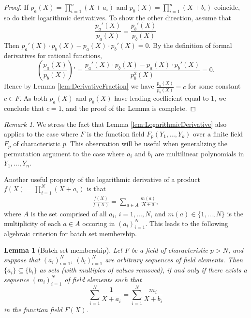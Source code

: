 \documentclass[11pt]{article}
\newtheorem{lem}[]{Lemma}
\theoremstyle{definition}
\theoremstyle{remark}
\newtheorem{rem}[thm]{Remark}
\begin{document}
\begin{proof}
If  $p_a(X) = \prod_{i=1}^n \left(X + a_i\right)$ and $p_b(X) = \prod_{i=1}^n \left(X + b_i\right)$
coincide, so do their logarithmic derivatives.
To show the other direction, assume that 
\[
\frac{p_a'(X)}{p_a(X)}  = \frac{p_b'(X)}{p_b(X)}
\]
Then $p_a'(X)\cdot p_b(X) - p_a(X)\cdot  p_b'(X) = 0$. 
By the definition of formal derivatives for rational functions,  
\[
\left(\frac{p_a(X)}{p_b(X)}\right)'  = \frac{p_a'(X)\cdot p_b(X) - p_a(X)\cdot  p_b'(X)} {p_b^2(X)} = 0.
\]
Hence by Lemma \ref{lem:DerivativeFraction} we have $\frac{p_a(X)}{p_b(X)} = c$ for some constant  $c \in F$.
As both $p_a(X)$ and $p_b(X)$ have leading coefficient equal to $1$, we conclude that $c =1$, and the proof of the Lemma is complete.
\end{proof}
\begin{rem}
\label{rem:LogarithmicDerivativeFunctionField}
We stress the fact that Lemma \ref{lem:LogarithmicDerivative} also applies to the case where $F$  is the function field $F_p(Y_1,\ldots, Y_k)$ over a finite field $F_p$ of characteristic $p$.
This observation will be useful when generalizing the permutation argument to the case where $a_i$ and $b_i$ are multilinear polynomials in $Y_1, \ldots, Y_n$.
\end{rem}

Another useful property of the logarithmic derivative of a product $f(X)=\prod_{i=1}^N (X + a_i)$ is that
\begin{align*}
\frac{f(X)}{f'(X)} = \sum_{a\in A} \frac{m(a)}{X + a},
\end{align*}
where $A$ is the set comprised of all $a_i$, $i=1,\ldots, N$,  and $m(a)\in \{1,\ldots, N\}$ is the multiplicity of each $a\in A$ occoring in $(a_i)_{i=1}^N$.
This leads to the following algebraic criterion for batch set membership.
\begin{lem}[Batch set membership]
\label{lem:SetInclusion}
Let $F$ be a field of characteristic $p>N$, and suppose that $(a_i)_{i=1}^N$, $(b_i)_{i=1}^N$ are arbitrary sequences of field elements.
Then $\{a_i \}\subseteq \{b_i\}$ as sets (with multiples of values removed), if and only if there exists a sequence $(m_i)_{i=1}^N$ of field elements such that
\begin{equation}
\label{e:fracs}
\sum_{i=1}^N \frac{1}{X + a_i} = \sum_{i=1}^N \frac{m_i}{X + b_i}  
\end{equation}
in the function field $F(X)$.
\end{lem}
\end{document}
